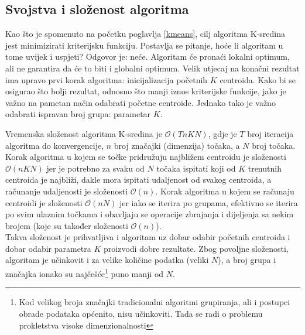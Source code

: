 \documentclass[times, utf8, zavrsni]{fer}
\begin{document}
\subsection{Svojstva i složenost algoritma}
\label{kmsvojstva}
Kao što je spomenuto na početku poglavlja \ref{kmeans}, cilj algoritma K-sredina jest minimizirati kriterijsku funkciju. Postavlja se pitanje, hoće li algoritam u tome uvijek i uspjeti? Odgovor je: neće. Algoritam će pronaći lokalni optimum, ali ne garantira da će to biti i globalni optimum. Velik utjecaj na konačni rezultat ima upravo prvi korak algoritma: inicijalizacija početnih $K$ centroida. Kako bi se osigurao što bolji rezultat, odnosno što manji iznos kriterijske funkcije, jako je važno na pametan način odabrati početne centroide. Jednako tako je važno odabrati ispravan broj grupa: parametar $K$.

Vremenska složenost algoritma K-sredina je $\mathcal{O} \left(TnKN\right)$, gdje je $T$ broj iteracija algoritma do konvergencije, $n$ broj značajki (dimenzija) točaka, a $N$ broj točaka. Korak algoritma u kojem se točke pridružuju najbližem centroidu je složenosti $\mathcal{O} \left(nKN\right)$ jer je potrebno za svaku od $N$ točaka ispitati koji od $K$ trenutnih centroida je najbliži, dakle mora ispitati udaljenost od svakog centroida, a računanje udaljenosti je složenosti $\mathcal{O} \left(n\right)$. Korak algoritma u kojem se računaju centroidi je složenosti $\mathcal{O} \left(nN\right)$ jer iako se iterira po grupama, efektivno se iterira po svim ulaznim točkama i obavljaju se operacije zbrajanja i dijeljenja sa nekim brojem (koje su također složenosti $\mathcal{O} \left(n\right)$).\\
Takva složenost je prihvatljiva i algoritam uz dobar odabir početnih centroida i dobar odabir parametra $K$ proizvodi dobre rezultate. Zbog povoljne složenosti, algoritam je učinkovit i za velike količine podatka (veliki $N$), a broj grupa i značajka ionako su najčešće\footnote{Kod velikog broja značajki tradicionalni algoritmi grupiranja, ali i postupci obrade podataka općenito, nisu učinkoviti. Tada se radi o problemu prokletstva visoke dimenzionalnosti } puno manji od $N$.
\end{document}
